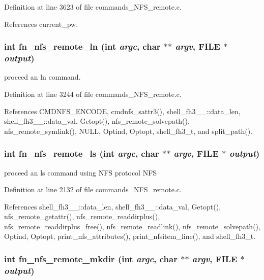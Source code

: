 Definition at line 3623 of file commands\_\-NFS\_\-remote.c.

References current\_\-pw.
\subsubsection{\setlength{\rightskip}{0pt plus 5cm}int fn\_\-nfs\_\-remote\_\-ln (int {\em argc}, char $\ast$$\ast$ {\em argv}, FILE $\ast$ {\em output})}\label{commands__NFS__remote_8c_a68}


proceed an ln command. 

Definition at line 3244 of file commands\_\-NFS\_\-remote.c.

References CMDNFS\_\-ENCODE, cmdnfs\_\-sattr3(), shell\_\-fh3\_\-\_\-::data\_\-len, shell\_\-fh3\_\-\_\-::data\_\-val, Getopt(), nfs\_\-remote\_\-solvepath(), nfs\_\-remote\_\-symlink(), NULL, Optind, Optopt, shell\_\-fh3\_\-t, and split\_\-path().
\subsubsection{\setlength{\rightskip}{0pt plus 5cm}int fn\_\-nfs\_\-remote\_\-ls (int {\em argc}, char $\ast$$\ast$ {\em argv}, FILE $\ast$ {\em output})}\label{commands__NFS__remote_8c_a60}


proceed an ls command using NFS protocol NFS 

Definition at line 2132 of file commands\_\-NFS\_\-remote.c.

References shell\_\-fh3\_\-\_\-::data\_\-len, shell\_\-fh3\_\-\_\-::data\_\-val, Getopt(), nfs\_\-remote\_\-getattr(), nfs\_\-remote\_\-readdirplus(), nfs\_\-remote\_\-readdirplus\_\-free(), nfs\_\-remote\_\-readlink(), nfs\_\-remote\_\-solvepath(), Optind, Optopt, print\_\-nfs\_\-attributes(), print\_\-nfsitem\_\-line(), and shell\_\-fh3\_\-t.
\subsubsection{\setlength{\rightskip}{0pt plus 5cm}int fn\_\-nfs\_\-remote\_\-mkdir (int {\em argc}, char $\ast$$\ast$ {\em argv}, FILE $\ast$ {\em output})}\label{commands__NFS__remote_8c_a63}


